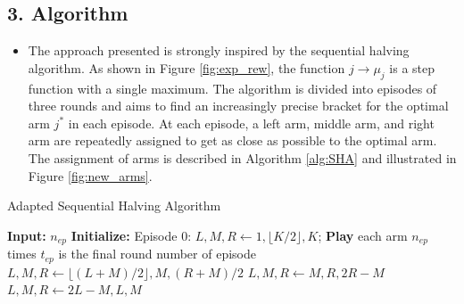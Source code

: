 \documentclass[
]{ImperialPoster}
\begin{document}
\begin{multicols}{2}
	\subsection{3. Algorithm}
	
	\begin{itemize}
		\item The approach presented is strongly inspired by the \textcolor{ICLBlue}{sequential halving algorithm}\cite{SHA}. As shown in Figure \ref{fig:exp_rew}, the function
		$j \rightarrow \mu_j$ is a step function with a single maximum. The algorithm is divided into episodes of three rounds and aims to find an increasingly precise bracket for the optimal arm $j^*$
		in each episode. At each episode, a left arm, middle arm, and right arm are repeatedly assigned to get as close as possible to the optimal arm.
		The assignment of arms is described in Algorithm \ref{alg:SHA} and illustrated in Figure \ref{fig:new_arms}.
	\end{itemize}

	\begin{algorithm}[H]
		\caption{Adapted Sequential Halving Algorithm}\label{alg:SHA}
	    \begin{algorithmic}
		\State \textbf{Input:} $n_{ep}$ 
		\State \textbf{Initialize:} Episode 0: $L, M, R \gets1,\lfloor K/2 \rfloor,  K$;
		\State \textbf{Play} each arm $n_{ep}$ times
		\State $t_{ep}$ is the final round number of episode
			\State $L, M, R \gets \lfloor (L + M)/2\rfloor, M, (R + M)/2$
		\EndIf
			\State $L, M, R \gets M, R, 2R - M$
		\EndIf
			\State $L, M, R \gets 2 L - M, L, M$
		\EndIf {}
		\EndFor
	     \end{algorithmic}
		\end{algorithm}


\end{multicols}
\end{document}
